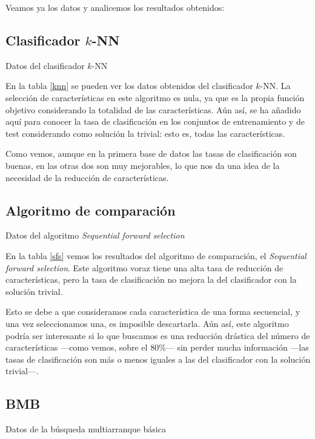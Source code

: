 \documentclass[a4paper, 11pt, titlepage]{article}
\begin{document}
    Veamos ya los datos y analicemos los resultados obtenidos:

    \subsection{Clasificador $k$-NN}
    \begin{table}[!htb]
        \maketable{\dataKNN}
        \caption{Datos del clasificador $k$-NN}
        \label{knn}
    \end{table}

    En la tabla \ref{knn} se pueden ver los datos obtenidos del clasificador $k$-NN. La selección de características en este algoritmo es nula, ya que es la propia función objetivo considerando la totalidad de las características. Aún así, se ha añadido aquí para conocer la tasa de clasificación en los conjuntos de entrenamiento y de test considerando como solución la trivial: esto es, todas las características.

    Como vemos, aunque en la primera base de datos las tasas de clasificación son buenas, en las otras dos son muy mejorables, lo que nos da una idea de la necesidad de la reducción de características.

    \subsection{Algoritmo de comparación}
    \begin{table}[!htb]
        \maketable{\dataSFS}
        \caption{Datos del algoritmo \emph{Sequential forward selection}}
        \label{sfs}
    \end{table}

    En la tabla \ref{sfs} vemos los resultados del algoritmo de comparación, el \emph{Sequential forward selection}. Este algoritmo voraz tiene una alta tasa de reducción de características, pero la tasa de clasificación no mejora la del clasificador con la solución trivial.

    Esto se debe a que consideramos cada característica de una forma secuencial, y una vez seleccionamos una, es imposible descartarla. Aún así, este algoritmo podría ser interesante si lo que buscamos es una reducción drástica del número de características ---como vemos, sobre el 80\%--- sin perder mucha información ---las tasas de clasificación son más o menos iguales a las del clasificador con la solución trivial---.

    \subsection{BMB}
    \begin{table}[!htb]
        \maketable{\dataBMB}
        \caption{Datos de la búsqueda multiarranque básica}
        \label{tablaBMB}
    \end{table}
\end{document}
